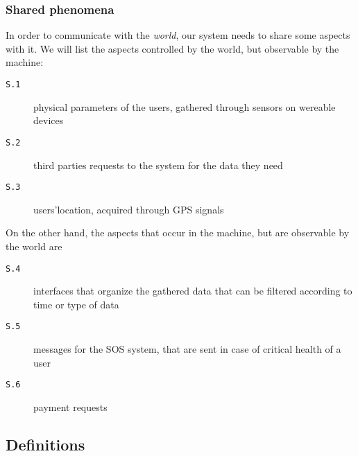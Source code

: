 \documentclass[../DD0.tex]{subfiles}
\begin{document}
    \subsubsection{Shared phenomena}
    \label{sec:sharedp}

      In order to communicate with the \textit{world}, our system needs to share some aspects with it. We will list the aspects controlled by the world, but observable by the machine:
      \begin{description}
        \item[\texttt{S.1}] physical parameters of the users, gathered through sensors on wereable devices

        \item[\texttt{S.2}] third parties requests to the system for the data they need

        \item[\texttt{S.3}] users'location, acquired through GPS signals
      \end{description}
      On the other hand, the aspects that occur in the machine, but are observable by the world are
      \begin{description}
        \item[\texttt{S.4}] interfaces that organize the gathered data that can be filtered according to time or type of data

        \item[\texttt{S.5}] messages for the SOS system, that are sent in case of critical health of a user

        \item[\texttt{S.6}] payment requests
      \end{description}

  \subsection{Definitions}
  \label{sec:definitions}
\end{document}
